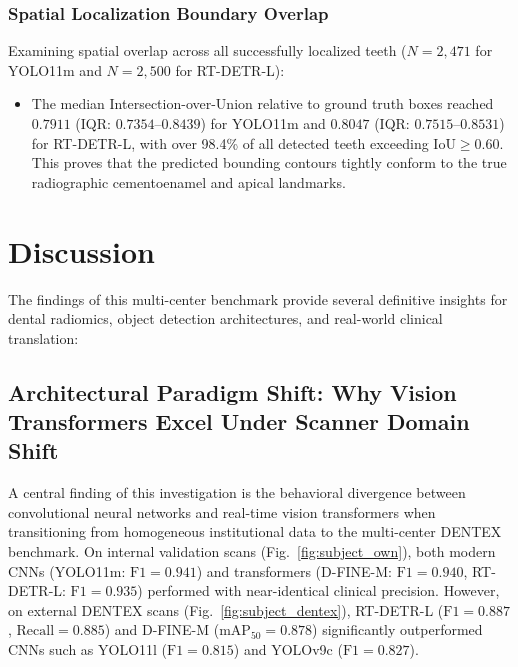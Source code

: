 \documentclass[10pt,journal,compsoc]{IEEEtran}
\begin{document}
\subsubsection{Spatial Localization Boundary Overlap}
Examining spatial overlap across all successfully localized teeth ($N=2,471$ for YOLO11m and $N=2,500$ for RT-DETR-L):
\begin{itemize}
    \item The median Intersection-over-Union relative to ground truth boxes reached $0.7911$ (IQR: $0.7354\text{--}0.8439$) for YOLO11m and $0.8047$ (IQR: $0.7515\text{--}0.8531$) for RT-DETR-L, with over 98.4\% of all detected teeth exceeding $\text{IoU} \ge 0.60$. This proves that the predicted bounding contours tightly conform to the true radiographic cementoenamel and apical landmarks.
\end{itemize}

\section{Discussion}
\label{sec:discussion}
The findings of this multi-center benchmark provide several definitive insights for dental radiomics, object detection architectures, and real-world clinical translation:

\subsection{Architectural Paradigm Shift: Why Vision Transformers Excel Under Scanner Domain Shift}
A central finding of this investigation is the behavioral divergence between convolutional neural networks and real-time vision transformers when transitioning from homogeneous institutional data to the multi-center DENTEX benchmark. On internal validation scans (Fig.~\ref{fig:subject_own}), both modern CNNs (YOLO11m: $\text{F1} = 0.941$) and transformers (D-FINE-M: $\text{F1} = 0.940$, RT-DETR-L: $\text{F1} = 0.935$) performed with near-identical clinical precision. However, on external DENTEX scans (Fig.~\ref{fig:subject_dentex}), RT-DETR-L ($\text{F1} = 0.887$, $\text{Recall} = 0.885$) and D-FINE-M ($\text{mAP}_{50} = 0.878$) significantly outperformed CNNs such as YOLO11l ($\text{F1} = 0.815$) and YOLOv9c ($\text{F1} = 0.827$).
\end{document}
